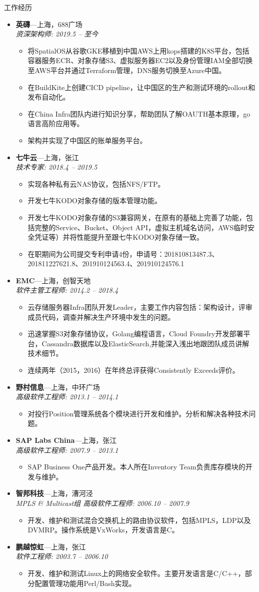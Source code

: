 \documentclass[11pt,oneside]{article}
\newenvironment{ressection}[1]{
	\vspace{4pt}
	{\selectfont\Large#1}
	\begin{itemize}
	\vspace{3pt}
}{
	\end{itemize}
}
\newcommand{\ressubitem}[1]{
	\vspace{-1pt}
	\item \begin{flushleft} #1 \end{flushleft}
}
\newcommand{\resbigitem}[3]{
	\vspace{-5pt}
	\item
	\textbf{#1}---#2 \\
	\textit{#3}
}
\newenvironment{ressubsec}[3]{
	\resbigitem{#1}{#2}{#3}
	\vspace{-2pt}
	\begin{itemize}
}{
    \end{itemize}
}
\begin{document}
\begin{ressection}{工作经历}

	\begin{ressubsec}{英礴}{上海，688广场}{资深架构师: 2019.5 -- 至今}
		\ressubitem{将SpatialOS从谷歌GKE移植到中国AWS上用kops搭建的K8S平台，包括容器服务ECR、对象存储S3、虚拟服务器EC2以及身份管理IAM全部切换至AWS平台并通过Terraform管理，DNS服务切换至Azure中国。}
		\ressubitem{在BuildKite上创建CICD pipeline，让中国区的生产和测试环境的rollout和发布自动化。}
		\ressubitem{在China Infra团队内进行知识分享，帮助团队了解OAUTH基本原理，go语言高阶应用等。}
		\ressubitem{架构并实现了中国区的账单服务平台。}
	\end{ressubsec}

	\begin{ressubsec}{七牛云}{上海，张江}{技术专家: 2018.4 -- 2019.5}
		\ressubitem{实现各种私有云NAS协议，包括NFS/FTP。}
		\ressubitem{开发七牛KODO对象存储的版本管理功能。}
		\ressubitem{开发七牛KODO对象存储的S3兼容网关，在原有的基础上完善了功能，包括完整的Service、Bucket、Object API，虚拟主机域名访问，AWS临时安全凭证等）并将性能提升至跟七牛KODO对象存储一致。}
		\ressubitem{在职期间为公司提交专利申请4份，申请号：201810813487.3、201811227621.8、201910124563.4、201910124576.1}
	\end{ressubsec}

	\begin{ressubsec}{EMC}{上海，创智天地}{软件主管工程师: 2014.2 -- 2018.4}
		\ressubitem{云存储服务器Infra团队开发Leader，主要工作内容包括：架构设计，评审成员代码，调查并解决生产环境中发生的问题。}
		\ressubitem{迅速掌握S3对象存储协议，Golang编程语言，Cloud Foundry开发部署平台，Cassandra数据库以及ElasticSearch,并能深入浅出地跟团队成员讲解技术细节。}
		\ressubitem{连续两年（2015，2016）在年终总评获得Consistently Exceeds评价。}
	\end{ressubsec}

	\begin{ressubsec}{野村信息}{上海，中环广场}{高级软件工程师: 2013.1 -- 2014.1}
		\ressubitem{对投行Position管理系统各个模块进行开发和维护。分析和解决各种技术问题。}
	\end{ressubsec}

	\begin{ressubsec}{SAP Labs China}{上海，张江}{高级软件工程师: 2007.9 -- 2013.1}
		\ressubitem{SAP Business One产品开发。本人所在Inventory Team负责库存模块的开发与维护。}
	\end{ressubsec}

	\begin{ressubsec}{智邦科技}{上海，漕河泾}{MPLS \& Multicast组 高级软件工程师: 2006.10 -- 2007.9}
		\ressubitem{开发、维护和测试混合交换机上的路由协议软件，包括MPLS，LDP以及DVMRP。操作系统是VxWorks，开发语言是C。}
	\end{ressubsec}

	\begin{ressubsec}{鹏越惊虹}{上海，张江}{软件工程师: 2003.7 -- 2006.10}
		\ressubitem{开发、维护和测试Linux上的网络安全软件。主要开发语言是C/C++，部分配置管理功能用Perl/Bash实现。}
	\end{ressubsec}

\end{ressection}
\end{document}
